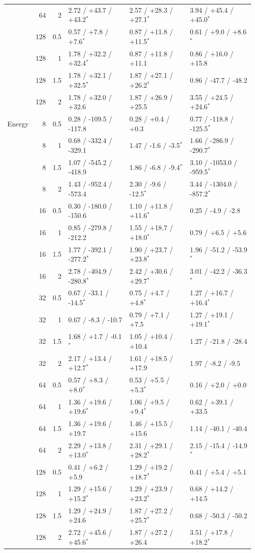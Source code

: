 \documentclass[10pt,a4paper]{article}
\begin{document}
\begin{center}
\begin{tabular}{@{}lrrlll@{}}
&64&2&2.72 / +43.7 / +43.2$^*$&2.57 / +28.3 / +27.1$^*$&3.94 / +45.4 / +45.0$^*$\\
&128&0.5&0.57 / +7.8 / +7.6$^*$&0.87 / +11.8 / +11.5$^*$&0.61 / +9.0 / +8.6$^*$\\
&128&1&1.78 / +32.2 / +32.4$^*$&0.87 / +11.8 / +11.1&0.86 / +16.0 / +15.8\\
&128&1.5&1.78 / +32.1 / +32.5$^*$&1.87 / +27.1 / +26.2$^*$&0.86 / -47.7 / -48.2\\
&128&2&1.78 / +32.0 / +32.6&1.87 / +26.9 / +25.5&3.55 / +24.5 / +24.6$^*$\\
\midrule
Energy&8&0.5&0.28 / -109.5 / -117.8&0.28 / +0.4 / +0.3&0.77 / -118.8 / -125.5$^*$\\
&8&1&0.68 / -332.4 / -329.1&1.47 / -1.6 / -3.5$^*$&1.66 / -286.9 / -290.7$^*$\\
&8&1.5&1.07 / -545.2 / -418.9&1.86 / -6.8 / -9.4$^*$&3.10 / -1053.0 / -959.5$^*$\\
&8&2&1.43 / -952.4 / -573.4&2.30 / -9.6 / -12.5$^*$&3.44 / -1304.0 / -857.2$^*$\\
&16&0.5&0.30 / -180.0 / -150.6&1.10 / +11.8 / +11.6$^*$&0.25 / -4.9 / -2.8\\
&16&1&0.85 / -279.8 / -212.2&1.55 / +18.7 / +18.0$^*$&0.79 / +6.5 / +5.6\\
&16&1.5&1.77 / -392.1 / -277.2$^*$&1.90 / +23.7 / +23.8$^*$&1.96 / -51.2 / -53.9$^*$\\
&16&2&2.78 / -404.9 / -280.8$^*$&2.42 / +30.6 / +29.7$^*$&3.01 / -42.2 / -36.3$^*$\\
&32&0.5&0.67 / -33.1 / -14.5$^*$&0.75 / +4.7 / +4.8$^*$&1.27 / +16.7 / +16.4$^*$\\
&32&1&0.67 / -8.3 / -10.7&0.79 / +7.1 / +7.5&1.27 / +19.1 / +19.1$^*$\\
&32&1.5&1.68 / +1.7 / -0.1$^*$&1.05 / +10.4 / +10.4&1.27 / -21.8 / -28.4\\
&32&2&2.17 / +13.4 / +12.7$^*$&1.61 / +18.5 / +17.9&1.97 / -8.2 / -9.5\\
&64&0.5&0.57 / +8.3 / +8.0$^*$&0.53 / +5.5 / +5.3$^*$&0.16 / +2.0 / +0.0\\
&64&1&1.36 / +19.6 / +19.6$^*$&1.06 / +9.5 / +9.4$^*$&0.62 / +39.1 / +33.5\\
&64&1.5&1.36 / +19.6 / +19.7&1.46 / +15.5 / +15.6&1.14 / -40.1 / -40.4\\
&64&2&2.29 / +13.8 / +13.0$^*$&2.31 / +29.1 / +28.2$^*$&2.15 / -15.4 / -14.9$^*$\\
&128&0.5&0.41 / +6.2 / +5.9&1.29 / +19.2 / +18.7$^*$&0.41 / +5.4 / +5.1\\
&128&1&1.29 / +15.6 / +15.2$^*$&1.29 / +23.9 / +23.2$^*$&0.68 / +14.2 / +14.5\\
&128&1.5&1.29 / +24.9 / +24.6&1.87 / +27.2 / +25.7$^*$&0.68 / -50.3 / -50.2\\
&128&2&2.72 / +45.6 / +45.6$^*$&1.87 / +27.2 / +26.4&3.51 / +17.8 / +18.2$^*$\\
\bottomrule
\end{tabular}
\end{center}
\end{document}
